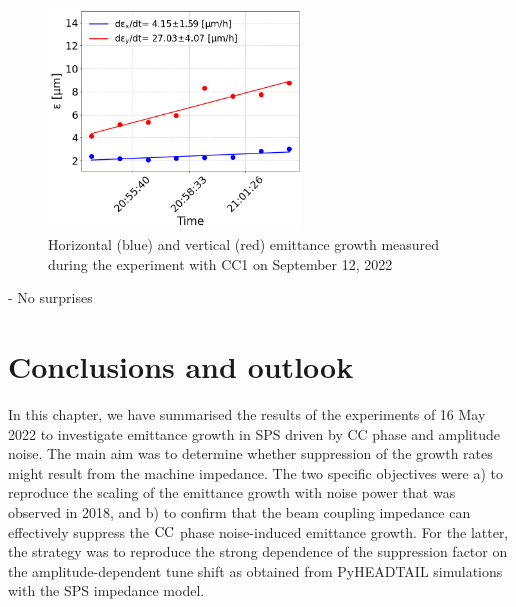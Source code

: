 \begin{figure}[!h]
   \centering         
   \includegraphics[width=0.6\textwidth]{images/Ch8/cc_md_sep22_AN_coast12.png}
       \caption{Horizontal (blue) and vertical (red) emittance growth measured during the experiment with CC1 on September 12, 2022}
       \label{fig:H_V_emit_growth_Amplitude_noise_coast12}
\end{figure}

- No surprises


\section{Conclusions and outlook}\label{sec:Ch8_conclusions}
In this chapter, we have summarised the results of the experiments of 16 May 2022 to investigate emittance growth in SPS driven by CC phase and amplitude noise.  The main aim was to determine whether suppression of the growth rates might result from the machine impedance. The two specific objectives were a) to reproduce the scaling of the emittance growth with noise power that was observed in 2018, and b) to confirm that the beam coupling impedance can effectively suppress the ${\mathrm{CC}}$ phase noise-induced emittance growth. For the latter, the strategy was to reproduce the strong dependence of the suppression factor on the amplitude-dependent tune shift as obtained from PyHEADTAIL simulations with the SPS impedance model.

